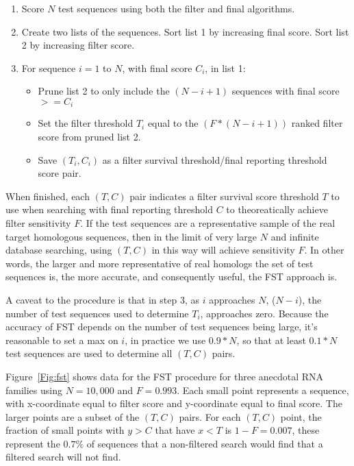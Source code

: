 \begin{enumerate}
\item
  Score $N$ test sequences using both the filter and final algorithms.
\item
  Create two lists of the sequences. Sort list 1 by increasing final
  score. Sort list 2 by increasing filter score.
\item
  For sequence $i=1$ to $N$, with final score $C_i$, in list 1:
\begin{itemize}
\item
  Prune list 2 to only include the $(N-i+1)$ sequences with final score
  $>=C_i$
\item
  Set the filter threshold $T_i$ equal to the $(F*(N-i+1))$
  ranked filter score from pruned list 2. 
\item
  Save $(T_i,C_i)$ as a filter survival threshold/final reporting
  threshold score pair.
\end{itemize}
\end{enumerate}

When finished, each $(T,C)$ pair indicates a filter survival score
threshold $T$ to use when searching with final reporting threshold $C$
to theoreatically achieve filter sensitivity $F$.  If the test
sequences are a representative sample of the real target homologous
sequences, then in the limit of very large $N$ and infinite database
searching, using $(T,C)$ in this way will achieve sensitivity $F$.
In other words, the larger and more representative of real homologs
the set of test sequences is, the more accurate, and consequently
useful, the FST approach is. 

A caveat to the procedure is that in step 3, as $i$ approaches $N$, ($N-i$), 
the number of test sequences used to determine $T_i$, approaches
zero. Because the accuracy of FST depends on the number of test
sequences being large, it's reasonable to set a max on $i$, in
practice we use $0.9 * N$, so that at least $0.1*N$ test sequences are
used to determine all $(T,C)$ pairs.

Figure~\ref{Fig:fst} shows data for the FST procedure for three
anecdotal RNA families using $N=10,000$ and $F=0.993$. Each small
point represents a sequence, with x-coordinate equal to filter score
and y-coordinate equal to final score. The larger points are a subset
of the $(T,C)$ pairs. For each $(T,C)$ point, the fraction of
small points with $y>C$ that have $x<T$ is $1-F=0.007$, these represent
the $0.7\%$ of sequences that a non-filtered search would find that a
filtered search will not find. 

